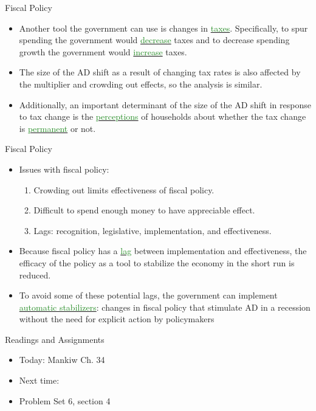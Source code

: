 \documentclass[xcolor={dvipsnames},pdf, hyperref={colorlinks=true, citecolor=ForestGreen, linkcolor=BlueViolet, urlcolor=Magenta}]{beamer}
\theoremstyle{definition}
\newcommand{\dd}[1]{{\underline{\textcolor{ForestGreen}{#1}}}}
\begin{document}
\begin{frame}{Fiscal Policy}
	\begin{itemize}
		\item Another tool the government can use is changes in \dd{taxes}. Specifically, to spur spending the government would \dd{decrease} taxes and to decrease spending growth the government would \dd{increase} taxes.
		\item The size of the AD shift as a result of changing tax rates is also affected by the multiplier and crowding out effects, so the analysis is similar.
		\item Additionally, an important determinant of the size of the AD shift in response to tax change is the \dd{perceptions} of households about whether the tax change is \dd{permanent} or not.
	\end{itemize}
\end{frame}

\begin{frame}{Fiscal Policy}
	\begin{itemize}
		\item Issues with fiscal policy:
		\begin{enumerate}
			\item Crowding out limits effectiveness of fiscal policy.
			\item Difficult to spend enough money to have appreciable effect.
			\item Lags: recognition, legislative, implementation, and effectiveness.
		\end{enumerate}
		\item Because fiscal policy has a \dd{lag} between implementation and effectiveness, the efficacy of the policy as a tool to stabilize the economy in the short run is reduced.
		\item To avoid some of these potential lags, the government can implement \dd{automatic stabilizers}: changes in fiscal policy that stimulate AD in a recession without the need for explicit action by policymakers
	\end{itemize}
\end{frame}

\begin{frame}{Readings and Assignments}
\begin{itemize}
	\item Today: Mankiw Ch. 34
	\item Next time: \frownie{} \frownie{} \frownie{}
	\item Problem Set 6, section 4
\end{itemize}
\end{frame}
\end{document}
